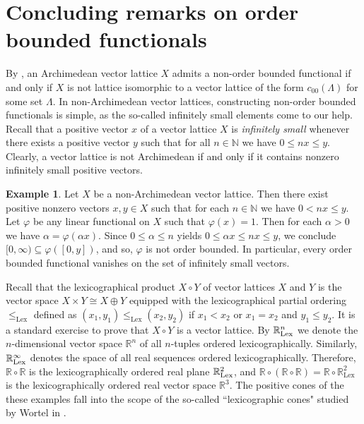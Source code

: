 \documentclass[12pt,reqno]{amsart}
\theoremstyle{plain}
\theoremstyle{definition}
\newtheorem{example}[theorem]{Example}
\begin{document}
\section{Concluding remarks on order bounded functionals}\label{Concluding}
 

By , an Archimedean vector lattice $X$ admits a non-order bounded functional if and only if $X$ is not lattice isomorphic to a vector lattice of the form $c_{00}(\Lambda)$ for some set $\Lambda$. 
In non-Archimedean vector lattices, constructing non-order bounded functionals is simple, as the so-called infinitely small elements come to our help. Recall that a positive vector $x$ of a vector lattice $X$ is \emph{infinitely small} whenever there exists a positive vector $y$ such that for all $n\in \mathbb N$ we have $0\leq nx\leq y$. Clearly, a vector lattice is not Archimedean if and only if it contains nonzero infinitely small positive vectors. 

\begin{example}\label{non archimedean non order bounded}
    Let $X$ be a non-Archimedean vector lattice. Then there exist positive nonzero vectors $x,y\in X$ such that for each $n\in \mathbb N$ we have $0<nx\leq y$. Let $\varphi$ be any linear functional on $X$ such that $\varphi(x)=1$. Then for each $\alpha>0$  we have $\alpha=\varphi(\alpha x)$. Since $0\leq \alpha\leq n$ yields $0\leq \alpha x\leq nx\leq y$, we conclude   $[0,\infty)\subseteq\varphi([0,y])$, and so, $\varphi$ is not order bounded. In particular, every order bounded functional vanishes on the set of infinitely small vectors. 
\end{example}

Recall that the lexicographical product $X\circ Y$ of vector lattices $X$ and $Y$ is the vector space $X\times Y\cong X\oplus Y$ equipped with the lexicographical partial ordering $\leq_{\mathrm{Lex}}$ defined as 
$(x_1, y_1) \leq_{\mathrm{Lex}} (x_2, y_2)$ if $x_1 < x_2$ or $x_1=x_2$ and $y_1\leq y_2$. It is a standard exercise to prove that $X\circ Y$ is a vector lattice. By $\mathbb R^n_{\rm{Lex}}$ we denote the $n$-dimensional vector space $\mathbb R^n$ of all $n$-tuples ordered lexicographically.
Similarly, $\mathbb R^\infty_{\rm{Lex}}$ denotes the space of all real sequences ordered lexicographically. 
Therefore, $\mathbb R\circ \mathbb R$ is the lexicographically ordered real plane $\mathbb R^2_{\rm{Lex}}$, and 
$\mathbb R \circ (\mathbb R \circ \mathbb R)=\mathbb R\circ \mathbb R^2_{\mathrm{Lex}}$ is the lexicographically ordered real vector space $\mathbb R^3$. The positive cones of the these examples fall into the scope of the so-called ``lexicographic cones" studied by Wortel in \cite{Wor19}.
\end{document}

